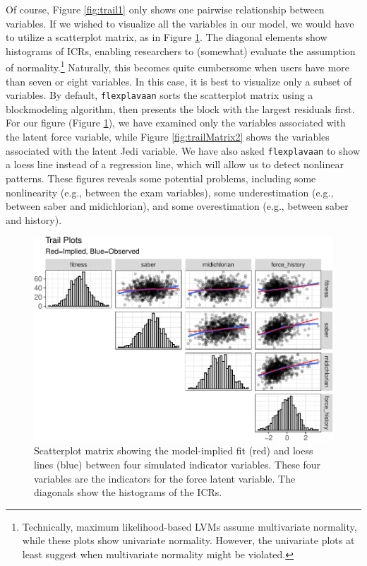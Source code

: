 \documentclass[
  english,
  man]{apa6}
\begin{document}
Of course, Figure \ref{fig:trail1} only shows one pairwise relationship between variables. If we wished to visualize all the variables in our model, we would have to utilize a scatterplot matrix, as in Figure \ref{fig:trailMatrix}. The diagonal elements show histograms of ICRs, enabling researchers to (somewhat) evaluate the assumption of normality.\footnote{Technically, maximum likelihood-based LVMs assume multivariate normality, while these plots show univariate normality. However, the univariate plots at least suggest when multivariate normality might be violated.} Naturally, this becomes quite cumbersome when users have more than seven or eight variables. In this case, it is best to visualize only a subset of variables. By default, \texttt{flexplavaan} sorts the scatterplot matrix using a blockmodeling algorithm, then presents the block with the largest residuals first. For our figure (Figure \ref{fig:trailMatrix}), we have examined only the variables associated with the latent force variable, while Figure \ref{fig:trailMatrix2} shows the variables associated with the latent Jedi variable. We have also asked \texttt{flexplavaan} to show a loess line instead of a regression line, which will allow us to detect nonlinear patterns. These figures reveals some potential problems, including some nonlinearity (e.g., between the exam variables), some underestimation (e.g., between saber and midichlorian), and some overestimation (e.g., between saber and history).

\begin{figure}

{\centering \includegraphics[width=0.9\linewidth]{flexplavaan_draft_files/figure-latex/trailMatrix-1} 

}

\caption{Scatterplot matrix showing the model-implied fit (red) and loess lines (blue) between four simulated indicator variables. These four variables are the indicators for the force latent variable. The diagonals show the histograms of the ICRs.}\label{fig:trailMatrix}
\end{figure}
\end{document}
